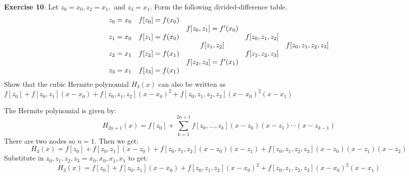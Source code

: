 \documentclass{article}
\begin{document}
\textbf{Exercise 10}: Let $z_{0} = x_{0}, z_{2} = x_{1}, $ and $z_{3} = x_{1}$. Form the following divided-difference table.
    \begin{align*}
        \begin{array}{ c c c c c }
            z_{0} = x_{0} & f[z_{0}] = f(x_{0}) &                                     &                        &                               \\
                          &                     & f[z_{0}, z_{1}] = f^{\prime}(x_{0}) &                        &                               \\
            z_{1} = x_{0} & f[z_{1}] = f(x_{0}) &                                     & f[z_{0}, z_{1}, z_{2}] &                               \\
                          &                     & f[z_{1}, z_{2}]                     &                        & f[z_{0}, z_{1}, z_{2}, z_{3}] \\
            z_{2} = x_{1} & f[z_{2}] = f(x_{1}) &                                     & f[z_{1}, z_{2}, z_{3}] &                               \\
                          &                     & f[z_{2}, z_{3}] = f^{\prime}(x_{1}) &                        &                               \\
            z_{3} = x_{1} & f[z_{3}] = f(x_{1}) &                                     &                        &                                 
        \end{array}
    \end{align*}
Show that the cubic Hermite polynomial $H_{3}(x)$ can also be written as $f[z_{0}] + f[z_{0}, z_{1}](x - x_{0}) + f[z_{0}, z_{1}, z_{2}](x- x_{0})^{2} + f[z_{0}, z_{1}, z_{2}, z_{3}](x - x_{0})^{2}(x - x_{1})$
    \begin{answer}
        The Hermite polynomial is given by:
            \begin{equation*}
                H_{2n + 1}(x) = f[z_{0}] + \sum_{k = 1}^{2n + 1} f[z_{0}, \ldots, z_{k}](x - z_{0})(x - z_{1}) \cdots (x - z_{k - 1})
            \end{equation*}
        There are two nodes so $n = 1$. Then we get:
            \begin{equation*}
                H_{3}(x) = f[z_{0}] + f[z_{0}, z_{1}](x - z_{0}) + f[z_{0}, z_{1}, z_{2}](x - z_{0})(x - z_{1}) + f[z_{0}, z_{1}, z_{2}, z_{3}](x - z_{0})(x - z_{1})(x - z_{2})
            \end{equation*}
        Substitute in $z_{0}, z_{1}, z_{2}, z_{3} = x_{0}, x_{0}, x_{1}, x_{1}$ to get:
            \begin{equation*}
                H_{3}(x) = f[z_{0}] + f[z_{0}, z_{1}](x - x_{0}) + f[z_{0}, z_{1}, z_{2}](x - x_{0})^{2} + f[z_{0}, z_{1}, z_{2}, z_{3}](x - x_{0})^{2}(x - x_{1})
            \end{equation*}
    \end{answer}
\end{document}
